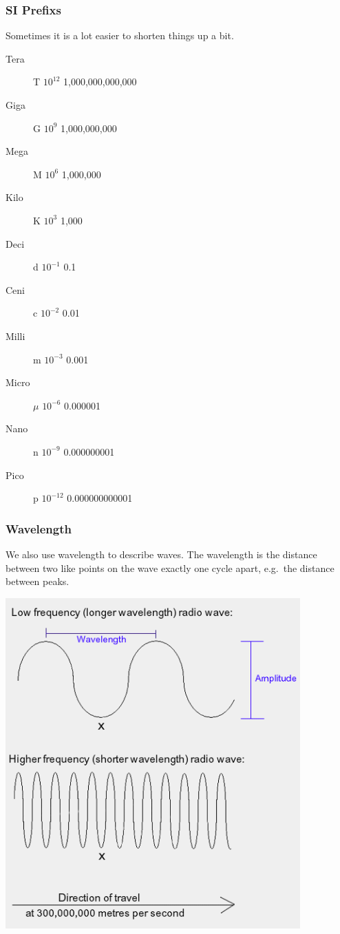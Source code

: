 \documentclass[10pt]{beamer}
\begin{document}
\begin{frame}
\frametitle{SI Prefixs}
Sometimes it is a lot easier to shorten things up a bit.
\begin{description}
\item[Tera]T $10^{12}$ 1,000,000,000,000
\item[Giga]G $10^9$ 1,000,000,000
\item[Mega]M $10^6$ 1,000,000
\item[Kilo]K $10^3$ 1,000
\item[Deci]d $10^{-1}$ 0.1
\item[Ceni]c $10^{-2}$ 0.01
\item[Milli]m $10^{-3}$ 0.001
\item[Micro]$\mu$ $10^{-6}$ 0.000001
\item[Nano]n $10^{-9}$ 0.000000001
\item[Pico]p $10^{-12}$ 0.000000000001
\end{description}
\end{frame}

\begin{frame}
\frametitle{Wavelength}
We also use wavelength to describe waves. The wavelength is the distance between two like points on the wave exactly one cycle apart, e.g.\ the distance between peaks.\\
\begin{center}
\includegraphics[width=0.85\textwidth,height=0.7\textheight]{wavelength.png}
\end{center}
\end{frame}
\end{document}
